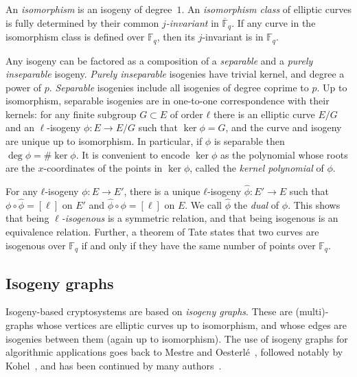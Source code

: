 \documentclass{llncs}
\newcommand{\F}{\mathbb{F}}
\newcommand{\Fbar}{\overline{\mathbb{F}}}
\begin{document}
An \emph{isomorphism} is an isogeny of degree~\(1\).
An \emph{isomorphism class} of elliptic curves is
fully determined by their common \emph{$j$-invariant} in $\Fbar_q$. 
If any curve in the isomorphism class is defined
over $\F_q$, then its $j$-invariant is in $\F_q$.

Any isogeny can be factored as a composition of a \emph{separable} and
a \emph{purely inseparable} isogeny. \emph{Purely inseparable}
isogenies have trivial kernel, and degree a power of $p$.
\emph{Separable} isogenies include all
isogenies of degree coprime to $p$.
Up to isomorphism, separable isogenies
are in one-to-one correspondence with their kernels:
for any finite subgroup $G⊂E$ of order $ℓ$ there is 
an elliptic curve $E/G$ and an $\ell$-isogeny $\phi: E \to E/G$
such that $\ker \phi = G$,
and the curve and isogeny are unique up to isomorphism.
In particular, if $\phi$ is separable then $\deg ϕ=\#\ker ϕ$.
It is convenient to encode $\ker\phi$ as
the polynomial whose roots are the $x$-coordinates of the points
in $\ker\phi$, called the \emph{kernel polynomial} of $\phi$.

For any $ℓ$-isogeny $ϕ:E→E'$, there is a unique $ℓ$-isogeny
$\hat{ϕ}:E'→E$ such that $ϕ∘\hat{ϕ} = [\ell]$ on $E'$
and $\hat{ϕ}∘ϕ = [\ell]$ on $E$.
We call $\hat{ϕ}$ the \emph{dual} of $ϕ$. This
shows that being \emph{$\ell$-isogenous} is a symmetric
relation, and that being isogenous is an equivalence relation.
 Further, a theorem of Tate states that two curves are
isogenous over $\F_q$ if and only if they have the same number of
points over $\F_q$.


\subsection{Isogeny graphs}
\label{sec:isogeny-graphs}

Isogeny-based cryptosystems are based on \emph{isogeny graphs}.
These are
(multi)-graphs whose vertices are
elliptic curves up to isomorphism, and whose edges are isogenies
between them (again up to isomorphism).
The use of isogeny graphs for algorithmic applications 
goes back to Mestre and Oesterlé~\cite{Mestre},
followed notably by Kohel~\cite{kohel},
and has been continued by many
authors~\cite{Gal,fouquet+morain02,GHS,MiretMSTV06,jao+miller+venkatesan09}.
\end{document}

